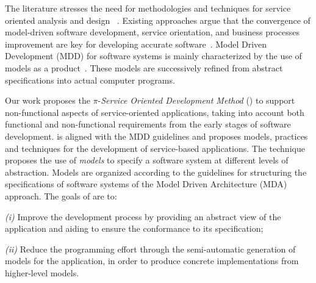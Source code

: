 




The literature stresses the need for methodologies and techniques for service oriented analysis and design 
~\cite{Papazoglou2007}. 
Existing approaches argue that the convergence of model-driven software development, service orientation,   and  business processes improvement are key for developing accurate  software~\cite{watson}. 
Model Driven Development (MDD)  for software systems is mainly characterized by the use of models as a product~\cite{Selic03}.
These models are successively refined from abstract specifications into actual computer programs.

Our work proposes  the $\pi$-\textit{Service Oriented Development Method} (\pisodm)
to support non-functional aspects of service-oriented applications, taking into account both functional and non-functional requirements from the early stages of software development.
\pisodm is aligned with the MDD guidelines and proposes models, practices and techniques for the development of service-based applications.  The technique proposes  the use of \textit{models} to specify a software system at different levels of abstraction. 
Models are organized according to the guidelines for structuring the specifications of software systems of the Model Driven Architecture (MDA)~\cite{miller} approach. 
The goals of  \pisodm are to:
\begin{trivlist}
\item \textit{(i)} Improve the development process by providing an abstract view of the application and aiding to ensure the conformance to its specification;
\item \textit{(ii)} Reduce the programming effort through the semi-automatic generation of  models for the application, in order to produce concrete implementations from higher-level models.
\end{trivlist}

